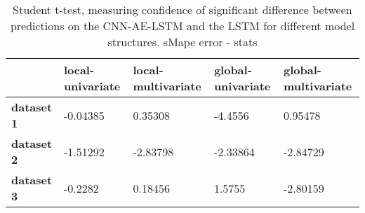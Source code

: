 \begin{table}[H]
\centering
\caption{Student t-test, measuring confidence of significant difference between predictions on the CNN-AE-LSTM and the LSTM for different model structures. sMape error - stats}
\label{table:ttest-stats-main-experiments-sMAPE}
\begin{tabular}{lllll}
\toprule
{} & local-univariate & local-multivariate & global-univariate & global-multivariate \\
\midrule
\textbf{dataset 1} &         -0.04385 &            0.35308 &           -4.4556 &             0.95478 \\
\textbf{dataset 2} &         -1.51292 &           -2.83798 &          -2.33864 &            -2.84729 \\
\textbf{dataset 3} &          -0.2282 &            0.18456 &            1.5755 &            -2.80159 \\
\bottomrule
\end{tabular}
\end{table}
